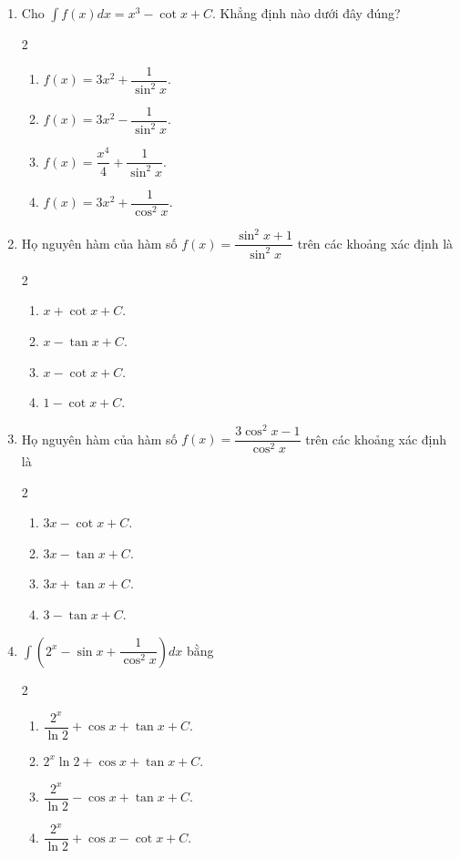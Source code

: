 \documentclass[12pt]{article}
\begin{document}
\begin{enumerate}[label=\textbf{Câu \arabic*.}]
		\item Cho $\displaystyle \int f(x)dx = x^3 - \cot x + C$. Khẳng định nào dưới đây đúng?
		\begin{multicols}{2}
			\begin{enumerate}[label=\textbf{\Alph*.}]
				\item $f(x) = 3x^2 + \dfrac{1}{\sin^2 x}$.
				\item $f(x) = 3x^2 - \dfrac{1}{\sin^2 x}$.
				\item $f(x) = \dfrac{x^4}{4} + \dfrac{1}{\sin^2 x}$.
				\item $f(x) = 3x^2 + \dfrac{1}{\cos^2 x}$.
			\end{enumerate}
		\end{multicols}
		
		\item Họ nguyên hàm của hàm số $f(x) = \dfrac{\sin^2 x + 1}{\sin^2 x}$ trên các khoảng xác định là
		\begin{multicols}{2}
			\begin{enumerate}[label=\textbf{\Alph*.}]
				\item $x + \cot x + C$.
				\item $x - \tan x + C$.
				\item $x - \cot x + C$.
				\item $1 - \cot x + C$.
			\end{enumerate}
		\end{multicols}
		
		\item Họ nguyên hàm của hàm số $f(x) = \dfrac{3\cos^2 x - 1}{\cos^2 x}$ trên các khoảng xác định là
		\begin{multicols}{2}
			\begin{enumerate}[label=\textbf{\Alph*.}]
				\item $3x - \cot x + C$.
				\item $3x - \tan x + C$.
				\item $3x + \tan x + C$.
				\item $3 - \tan x + C$.
			\end{enumerate}
		\end{multicols}
		
		\item $\displaystyle \int \left( 2^x - \sin x + \dfrac{1}{\cos^2 x} \right) dx$ bằng
		\begin{multicols}{2}
			\begin{enumerate}[label=\textbf{\Alph*.}]
				\item $\dfrac{2^x}{\ln 2} + \cos x + \tan x + C$.
				\item $2^x \ln 2 + \cos x + \tan x + C$.
				\item $\dfrac{2^x}{\ln 2} - \cos x + \tan x + C$.
				\item $\dfrac{2^x}{\ln 2} + \cos x - \cot x + C$.
			\end{enumerate}
		\end{multicols}
		

\end{enumerate}
\end{document}
